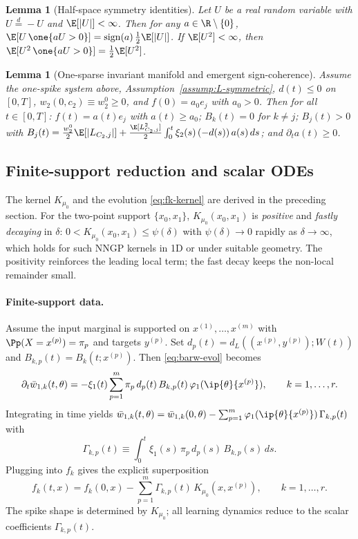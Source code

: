 \documentclass[nohyperref]{article}
\theoremstyle{plain}
\newtheorem{lemma}[theorem]{Lemma}
\theoremstyle{definition}
\theoremstyle{remark}
\begin{document}
\begin{lemma}[Half-space symmetry identities]\label{lem:halfspace-identities}
Let $U$ be a real random variable with $U\overset{d}{=}-U$ and $\E[|U|]<\infty$. Then for any $a\in\R\setminus\{0\}$, $\E[U\,\one \{aU>0\}]=\mathrm{sign}(a)\,\frac{1}{2}\E[|U|]$. If $\E[U^2]<\infty$, then $\E[U^2\,\one \{aU>0\}]=\frac{1}{2}\E[U^2]$.
\end{lemma}

\begin{lemma}[One-sparse invariant manifold and emergent sign-coherence]\label{lem:onesparse-reinforce}
Assume the one-spike system above, Assumption~\ref{assump:L-symmetric}, $d(t)\le 0$ on $[0,T]$, $w_2(0,c_2)\equiv w_2^0\ge 0$, and $f(0)=a_0 e_j$ with $a_0>0$. Then for all $t\in[0,T]$: $f(t)=a(t)e_j$ with $a(t)\ge a_0$; $B_k(t)=0$ for $k\neq j$; $B_j(t)>0$ with $B_j(t)=\frac{w_2^0}{2}\E[|L_{C_2,j}|]+\frac{\E[L_{C_2,j}^2]}{2}\int_0^t \xi_2(s)\,(-d(s))\,a(s)\,ds$; and $\partial_t a(t)\ge 0$.
\end{lemma}

\subsection{Finite-support reduction and scalar ODEs}
\label{app:finite-support-scalar}

The kernel $K_{\mu_0}$ and the evolution \eqref{eq:fk-kernel} are derived in the preceding section. For the two-point support $\{x_0,x_1\}$, $K_{\mu_0}(x_0,x_1)$ is \emph{positive} and \emph{fastly decaying} in $\delta$: $0<K_{\mu_0}(x_0,x_1)\le \psi(\delta)$ with $\psi(\delta)\to 0$ rapidly as $\delta\to\infty$, which holds for such NNGP kernels in 1D or under suitable geometry. The positivity reinforces the leading local term; the fast decay keeps the non-local remainder small.

\paragraph{Finite-support data.}
Assume the input marginal is supported on $x^{(1)},\ldots,x^{(m)}$ with $\Pp(X=x^{(p)})=\pi_p$ and targets $y^{(p)}$. Set $d_p(t)=d_L((x^{(p)},y^{(p)});W(t))$ and $B_{k,p}(t)=B_k(t;x^{(p)})$. Then \eqref{eq:barw-evol} becomes
\begin{equation}\label{eq:barw-finite-support}
\partial_t \bar w_{1,k}(t,\theta)=-\xi_1(t)\sum_{p=1}^m \pi_p\,d_p(t)\,B_{k,p}(t)\,\varphi_1(\ip{\theta}{x^{(p)}}),\qquad k=1,\dots,r.
\end{equation}
Integrating in time yields $\bar w_{1,k}(t,\theta)=\bar w_{1,k}(0,\theta)-\sum_{p=1}^m \varphi_1(\ip{\theta}{x^{(p)}})\,\Gamma_{k,p}(t)$ with
\begin{equation}\label{eq:Gamma-finite}
\Gamma_{k,p}(t)\equiv \int_0^t \xi_1(s)\,\pi_p\,d_p(s)\,B_{k,p}(s)\,ds.
\end{equation}
Plugging into $f_k$ gives the explicit superposition
\begin{equation}\label{eq:fk-superposition}
f_k(t,x)=f_k(0,x)-\sum_{p=1}^m \Gamma_{k,p}(t)\,K_{\mu_0}(x,x^{(p)}),\qquad k=1,\ldots,r.
\end{equation}
The spike shape is determined by $K_{\mu_0}$; all learning dynamics reduce to the scalar coefficients $\Gamma_{k,p}(t)$.
\end{document}
